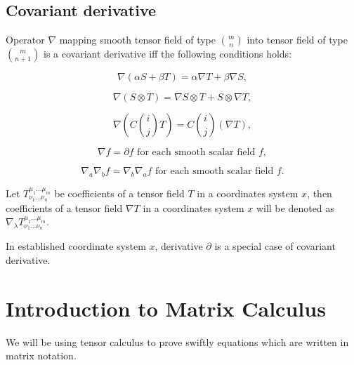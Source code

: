 \documentclass[main.tex]{subfiles}
\begin{document}
\subsection{Covariant derivative}
\begin{definition}
Operator $\nabla$ mapping smooth tensor field of type $\binom{m}{n}$ into tensor field of type $\binom{m}{n+1}$ is a covariant derivative iff the following conditions holds:

\begin{equation}
\nabla(\alpha S + \beta T) = \alpha \nabla T + \beta \nabla S,
\end{equation}

\begin{equation}
\nabla(S\otimes T) = \nabla S \otimes T + S \otimes \nabla T,
\end{equation}

\begin{equation}
\nabla (C\binom{i}{j} T) = C\binom{i}{j} (\nabla T),
\end{equation}

\begin{equation}
\nabla f = \partial f \text{ for each smooth scalar field } f,
\end{equation}

\begin{equation}
\nabla_a \nabla_b f = \nabla_b \nabla_a f \text{ for each smooth scalar field } f.
\end{equation} 

\end{definition}

\begin{definition}
Let $T^{\mu_1\dots\mu_m}_{\nu_1\dots\nu_n}$ be coefficients of a tensor field $T$ in a coordinates system $x$, then coefficients of a tensor field $\nabla T$ in a coordinates system $x$ will be denoted as $\nabla_\lambda T^{\mu_1\dots\mu_m}_{\nu_1\dots\nu_n}$.
\end{definition}  

\begin{remark}
In established coordinate system $x$, derivative $\partial$ is a special case of covariant derivative. 
\end{remark}
\section{Introduction to Matrix Calculus}
We will be using tensor calculus to prove swiftly equations which are written in matrix notation. 
\end{document}
